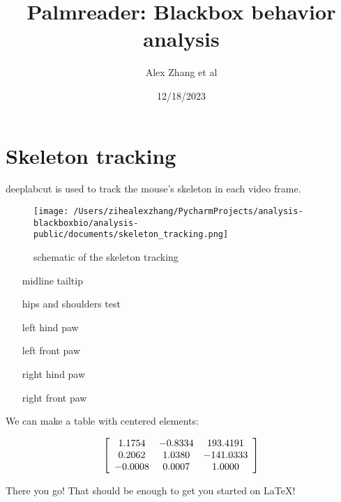 \documentclass[a4paper,12pt]{article} %
\title{Palmreader: Blackbox behavior analysis}
\author{Alex Zhang et al}
\date{12/18/2023} %
\begin{document}
\maketitle %


\section{Skeleton tracking}

deeplabcut is used to track the mouse's skeleton in each video frame.

\vspace{5mm}

\begin{figure}[!ht]
  \centering
  \texttt{[image: /Users/zihealexzhang/PycharmProjects/analysis-blackboxbio/analysis-public/documents/skeleton\_tracking.png]}
  \caption{schematic of the skeleton tracking}
\end{figure}


\vspace{5mm}
\begin{enumerate}[resume]
	\item[midline] tailtip
	\item[hips and shoulders] test
	\item[left hind paw]
	\item[left front paw]
	\item[right hind paw]
	\item[right front paw]
\end{enumerate}
\vspace{5mm}


\noindent
We can make a table with centered elements:

\vspace{5mm}
\[ \left[ \begin{array}{c c c}
1.1754 & -0.8334 & 193.4191\\
0.2062 & 1.0380 & -141.0333\\
-0.0008 & 0.0007 & 1.0000\\
\end{array}
\right] \]
\vspace{5mm}

\noindent
There you go! That should be enough to get you started on LaTeX!
\end{document}
